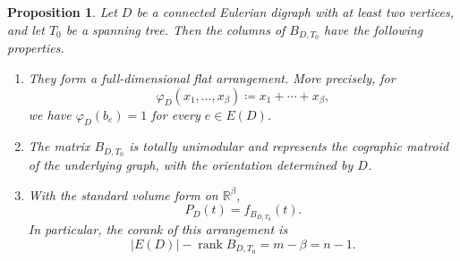 \documentclass[12pt]{amsart}
\newtheorem{proposition}[theorem]{Proposition}
\numberwithin{equation}{section}
\numberwithin{theorem}{section}
\newcommand{\op}{\operatorname}
\newcommand{\R}{\mathbb{R}}
\begin{document}
\begin{proposition}
  \label{prop-flat-cographic}
  Let $D$ be a connected Eulerian digraph with at least two vertices, and let $T_0$ be a spanning tree. Then the columns of $B_{D,T_0}$ have the following properties.
  \begin{enumerate}
    \item They form a full-dimensional flat arrangement. More precisely, for
    \begin{equation*}
      \varphi_D(x_1,\dots,x_\beta)\coloneqq x_1+\cdots+x_\beta,
    \end{equation*}
    we have $\varphi_D(b_e)=1$ for every $e\in E(D)$.
    
    \item The matrix $B_{D,T_0}$ is totally unimodular and represents the cographic matroid of the underlying graph, with the orientation determined by $D$.
    
    \item With the standard volume form on $\R^\beta$,
    \begin{equation}
      \label{eq-pd-equals-fa}
      P_D(t)=f_{B_{D,T_0}}(t).
    \end{equation}
    In particular, the corank of this arrangement is
    \begin{equation}
      \label{eq-cographic-corank}
      |E(D)|-\op{rank}B_{D,T_0}=m-\beta=n-1.
    \end{equation}
  \end{enumerate}
\end{proposition}
\end{document}
